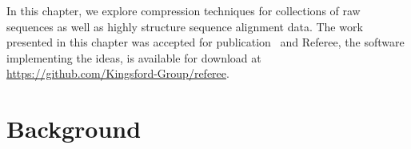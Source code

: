 \documentclass[12pt]{cmuthesis}
\newcommand{\refer}{\textsc{Referee}\xspace}
\begin{document}

In this chapter, we explore compression techniques for collections of raw sequences as well as highly structure sequence alignment data. The work presented in this chapter was accepted for publication~\cite{Referee_draft} and Referee, the software implementing the ideas, is available for download at \url{https://github.com/Kingsford-Group/referee}.



\section{Background}



\end{document}

